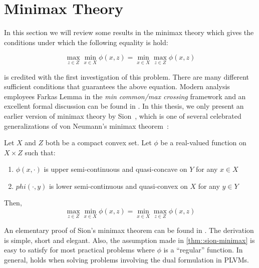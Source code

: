 \section{Minimax Theory}

In this section we will review some results in the minimax theory which gives
the conditions under which the following equality is hold:

\begin{equation}
 \max\limits_{z \in Z} \min\limits_{x \in X} \phi(x,z) =
 \min\limits_{x \in X} \max\limits_{z \in Z} \phi(x,z)  \label{eq::minimax}
\end{equation}

\citeauthor{neumann1928theorie} is credited with the first investigation of this
problem.  There are many different sufficient conditions that guarantees the
above equation. Modern analysis employees Farkas Lemma in the \emph{min
common/max crossing} framework and an excellent formal discussion can be found
in \cite{bertsekas2003convex}. In this thesis, we only present an earlier
version of minimax theory by Sion~\cite{sion1958general}, which is one of
several celebrated generalizations of von Neumann's minimax
theorem~\cite{neumann1928theorie}:

\begin{thm}\label{thm::sion-minimax}
  Let $X$ and $Z$ both be a compact convex set. Let $\phi$ be a real-valued
  function on $X \times Z$ such that:
  \begin{enumerate}
    \item $\phi(x, \cdot)$ is upper semi-continuous and quasi-concave on $Y$ for
      any $x \in X$
    \item $phi(\cdot, y)$ is lower semi-continuous and quasi-convex on $X$ for
      any $y \in Y$
  \end{enumerate}
  Then,
  $$ \max\limits_{z \in Z} \min\limits_{x \in X} \phi(x,z) =
     \min\limits_{x \in X} \max\limits_{z \in Z} \phi(x,z)  $$
\end{thm}

An elementary proof of Sion's minimax theorem can be found in
\cite{komiya1988elementary}. The derivation is simple, short and elegant. Also,
the assumption made in \cref{thm::sion-minimax} is easy to satisfy for most
practical problems where $\phi$ is a ``regular'' function. In general,
 holds when solving problems involving the dual formulation in
PLVMs.










